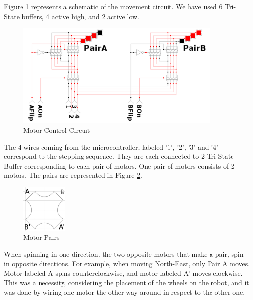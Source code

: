 Figure \ref{fig:mot_ctrl} represents a schematic of the movement circuit. We have used 6 Tri-State 
buffers, 4 active high, and 2 active low. 
\begin{figure}[htp]
	\centering
	\includegraphics[width=0.9\textwidth]{figures/move/direction_choice}
	\caption{Motor Control Circuit}
	\label{fig:mot_ctrl}
\end{figure}

The 4 wires coming from the microcontroller, labeled '1', '2', '3' and '4' correspond to the stepping sequence.
They are each connected to 2 Tri-State Buffer corresponding to each pair of motors. One pair of motors consists 
of 2 motors. The pairs are represented in Figure \ref{fig:motor_pairs_location}.

\begin{figure}[htp]
	\centering
	\includegraphics[width=0.2\textwidth]{figures/move/Motor_pairs_location.jpg}
	\caption{Motor Pairs}
	\label{fig:motor_pairs_location}
\end{figure}
\clearpage
When spinning in one direction, the two opposite motors that make a pair, spin in opposite 
directions. For example, when moving North-East, only Pair A moves. Motor labeled A spins 
counterclockwise, and motor labeled A’ moves clockwise. This was a necessity, considering the 
placement of the wheels on the robot, and it was done by wiring one motor the other way around in 
respect to the other one.

